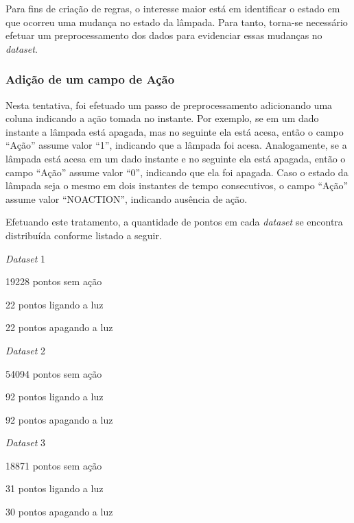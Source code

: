 Para fins de criação de regras, o interesse maior está em identificar o estado em que ocorreu uma mudança no estado da lâmpada. Para tanto, torna-se necessário efetuar um preprocessamento dos dados para evidenciar essas mudanças no \textit{dataset}.

\clearpage

\subsubsection{Adição de um campo de Ação}
Nesta tentativa, foi efetuado um passo de preprocessamento adicionando uma coluna indicando a ação tomada no instante. Por exemplo, se em um dado instante a lâmpada está apagada, mas no seguinte ela está acesa, então o campo ``Ação'' assume valor ``1'', indicando que a lâmpada foi acesa. Analogamente, se a lâmpada está acesa em um dado instante e no seguinte ela está apagada, então o campo ``Ação'' assume valor ``0'', indicando que ela foi apagada. Caso o estado da lâmpada seja o mesmo em dois instantes de tempo consecutivos, o campo ``Ação'' assume valor ``NO\underline{\space}ACTION'', indicando ausência de ação.

Efetuando este tratamento, a quantidade de pontos em cada \textit{dataset} se encontra distribuída conforme listado a seguir.

\begin{itemize_compact}
	\item \textit{Dataset} 1
	\begin{itemize_compact}
		\item 19228 pontos sem ação
		\item 22 pontos ligando a luz
		\item 22 pontos apagando a luz
	\end{itemize_compact}
		\item \textit{Dataset} 2
	\begin{itemize_compact}
		\item 54094 pontos sem ação
		\item 92 pontos ligando a luz
		\item 92 pontos apagando a luz
	\end{itemize_compact}
		\item \textit{Dataset} 3
	\begin{itemize_compact}
		\item 18871 pontos sem ação
		\item 31 pontos ligando a luz
		\item 30 pontos apagando a luz
	\end{itemize_compact}
\end{itemize_compact}

